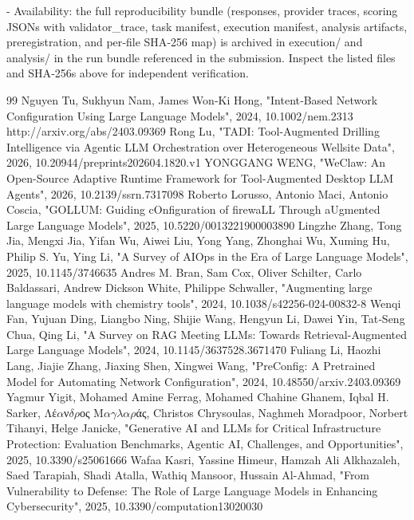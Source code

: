 \documentclass[conference]{IEEEtran}
\begin{document}
- Availability: the full reproducibility bundle (responses, provider traces, scoring JSONs with validator\_trace, task manifest, execution manifest, analysis artifacts, preregistration, and per‑file SHA‑256 map) is archived in execution/ and analysis/ in the run bundle referenced in the submission. Inspect the listed files and SHA‑256s above for independent verification.

\begin{thebibliography}{99}
 Nguyen Tu, Sukhyun Nam, James Won‐Ki Hong, "Intent‐Based Network Configuration Using Large Language Models", 2024, 10.1002/nem.2313
 http://arxiv.org/abs/2403.09369
 Rong Lu, "TADI: Tool-Augmented Drilling Intelligence via Agentic LLM Orchestration over Heterogeneous Wellsite Data", 2026, 10.20944/preprints202604.1820.v1
 YONGGANG WENG, "WeClaw: An Open-Source Adaptive Runtime Framework for Tool-Augmented Desktop LLM Agents", 2026, 10.2139/ssrn.7317098
 Roberto Lorusso, Antonio Maci, Antonio Coscia, "GOLLUM: Guiding cOnfiguration of firewaLL Through aUgmented Large Language Models", 2025, 10.5220/0013221900003890
 Lingzhe Zhang, Tong Jia, Mengxi Jia, Yifan Wu, Aiwei Liu, Yong Yang, Zhonghai Wu, Xuming Hu, Philip S. Yu, Ying Li, "A Survey of AIOps in the Era of Large Language Models", 2025, 10.1145/3746635
 Andres M. Bran, Sam Cox, Oliver Schilter, Carlo Baldassari, Andrew Dickson White, Philippe Schwaller, "Augmenting large language models with chemistry tools", 2024, 10.1038/s42256-024-00832-8
 Wenqi Fan, Yujuan Ding, Liangbo Ning, Shijie Wang, Hengyun Li, Dawei Yin, Tat‐Seng Chua, Qing Li, "A Survey on RAG Meeting LLMs: Towards Retrieval-Augmented Large Language Models", 2024, 10.1145/3637528.3671470
 Fuliang Li, Haozhi Lang, Jiajie Zhang, Jiaxing Shen, Xingwei Wang, "PreConfig: A Pretrained Model for Automating Network Configuration", 2024, 10.48550/arxiv.2403.09369
 Yagmur Yigit, Mohamed Amine Ferrag, Mohamed Chahine Ghanem, Iqbal H. Sarker, Λέ\ensuremath{\alpha}ν\ensuremath{\delta}\ensuremath{\rho}ος Μ\ensuremath{\alpha}\ensuremath{\gamma}\ensuremath{\lambda}\ensuremath{\alpha}\ensuremath{\rho}άς, Christos Chrysoulas, Naghmeh Moradpoor, Norbert Tihanyi, Helge Janicke, "Generative AI and LLMs for Critical Infrastructure Protection: Evaluation Benchmarks, Agentic AI, Challenges, and Opportunities", 2025, 10.3390/s25061666
 Wafaa Kasri, Yassine Himeur, Hamzah Ali Alkhazaleh, Saed Tarapiah, Shadi Atalla, Wathiq Mansoor, Hussain Al-Ahmad, "From Vulnerability to Defense: The Role of Large Language Models in Enhancing Cybersecurity", 2025, 10.3390/computation13020030

\end{thebibliography}
\end{document}
